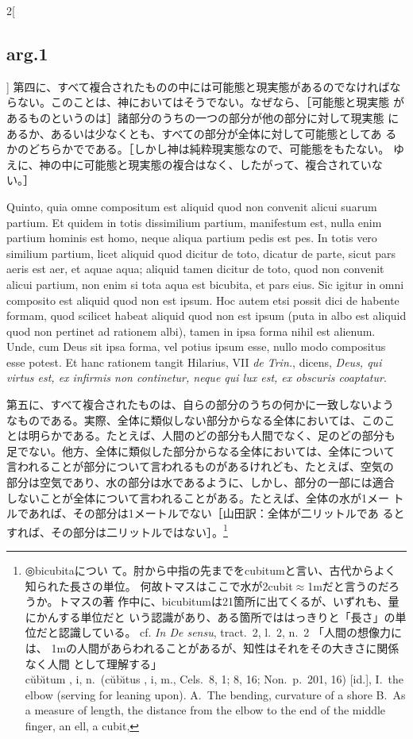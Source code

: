 \documentclass[paper=a4paper,fontsize=10pt,jafontsize=9pt,titlepage]{jlreq}
\begin{document}
\begin{paracol}{2}[\subsection{arg.1}]
第四に、すべて複合されたものの中には可能態と現実態があるのでなければな
らない。このことは、神においてはそうでない。なぜなら、［可能態と現実態
があるものというのは］諸部分のうちの一つの部分が他の部分に対して現実態
にあるか、あるいは少なくとも、すべての部分が全体に対して可能態としてあ
るかのどちらかでである。［しかし神は純粋現実態なので、可能態をもたない。
ゆえに、神の中に可能態と現実態の複合はなく、したがって、複合されていな
い。］

\switchcolumn*

Quinto, quia omne compositum est aliquid quod non convenit alicui
suarum partium. Et quidem in totis dissimilium partium, manifestum
est, nulla enim partium hominis est homo, neque aliqua partium pedis
est pes. In totis vero similium partium, licet aliquid quod dicitur de
toto, dicatur de parte, sicut pars aeris est aer, et aquae aqua;
aliquid tamen dicitur de toto, quod non convenit alicui partium, non
enim si tota aqua est bicubita, et pars eius. Sic igitur in omni
composito est aliquid quod non est ipsum. Hoc autem etsi possit dici
de habente formam, quod scilicet habeat aliquid quod non est ipsum
(puta in albo est aliquid quod non pertinet ad rationem albi), tamen
in ipsa forma nihil est alienum. Unde, cum Deus sit ipsa forma, vel
potius ipsum esse, nullo modo compositus esse potest. Et hanc rationem
tangit Hilarius, VII {\itshape de Trin.}, dicens, {\itshape Deus, qui
virtus est, ex infirmis non continetur, neque qui lux est, ex obscuris
coaptatur}.

\switchcolumn

第五に、すべて複合されたものは、自らの部分のうちの何かに一致しないよう
なものである。実際、全体に類似しない部分からなる全体においては、このこ
とは明らかである。たとえば、人間のどの部分も人間でなく、足のどの部分も
足でない。他方、全体に類似した部分からなる全体においては、全体について
言われることが部分について言われるものがあるけれども、たとえば、空気の
部分は空気であり、水の部分は水であるように、しかし、部分の一部には適合
しないことが全体について言われることがある。たとえば、全体の水が1メー
トルであれば、その部分は1メートルでない［山田訳：全体が二リットルであ
るとすれば、その部分は二リットルではない］。\footnote{◎bicubitaについ
て。肘から中指の先までをcubitumと言い、古代からよく知られた長さの単位。
何故トマスはここで水が2cubit$\approx$1mだと言うのだろうか。トマスの著
作中に、bicubitumは21箇所に出てくるが、いずれも、量にかんする単位だと
いう認識があり、ある箇所でははっきりと「長さ」の単位だと認識している。
cf. {\itshape In De sensu}, tract.~2, l.~2, n.~2 「人間の想像力には、
1mの人間があらわれることがあるが、知性はそれをその大きさに関係なく人間
として理解する」\\ c\u{u}b\u{\i}tum , i, n.~(c\u{u}b\u{\i}tus , i, m.,
Cels.~8, 1; 8, 16; Non.~p.~201, 16) [id.], I.~the elbow (serving for
leaning upon).  A.~The bending, curvature of a shore B.~As a measure
of length, the distance from the elbow to the end of the middle
finger, an ell, a cubit,

}
\end{paracol}
\end{document}
